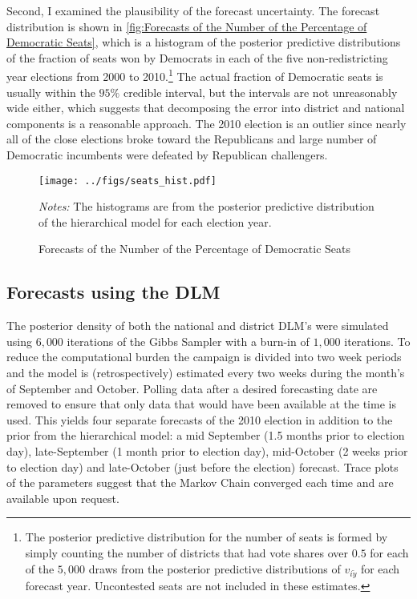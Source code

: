 \documentclass[12pt,final,fleqn]{article}
\theoremstyle{plain}
\begin{document}
Second, I examined the plausibility of the forecast uncertainty. The forecast distribution is shown in \autoref{fig:Forecasts of the Number of the Percentage of Democratic Seats}, which is a histogram of the posterior predictive distributions of the fraction of seats won by Democrats in each of the five non-redistricting year elections from 2000 to 2010.\footnote{ The posterior predictive distribution for the number of seats is formed by simply counting the number of districts that had vote shares over $0.5$ for each of the $5,000$ draws from the posterior predictive distributions of $v_{i\tilde{y}}$ for each forecast year. Uncontested seats are not included in these estimates.} The actual fraction of Democratic seats is usually within the $95\%$ credible interval, but the intervals are not unreasonably wide either, which suggests that decomposing the error into district and national components is a reasonable approach. The 2010 election is an outlier since nearly all of the close elections broke toward the Republicans and large number of Democratic incumbents were defeated by Republican challengers. 

\begin{figure}[!htb]
\centering
\texttt{[image: ../figs/seats\_hist.pdf]}
\vspace{.5cm}
\caption{Forecasts of the Number of the Percentage of Democratic Seats}
\label{fig:Forecasts of the Number of the Percentage of Democratic Seats}
\begin{minipage}{\linewidth}
\footnotesize
\emph{Notes:} The histograms are from the posterior predictive distribution of the hierarchical model for each election year.
\end{minipage}
\end{figure}

\subsection{Forecasts using the DLM} \label{sec: Results from the DLM}
The posterior density of both the national and district DLM's were simulated using $6,000$ iterations of the Gibbs Sampler with a burn-in of $1,000$ iterations. To reduce the computational burden the campaign is divided into two week periods and the model is (retrospectively) estimated every two weeks during the month's of September and October. Polling data after a desired forecasting date are removed to ensure that only data that would have been available at the time is used. This yields four separate forecasts of the 2010 election in addition to the prior from the hierarchical model: a mid September (1.5 months prior to election day), late-September (1 month prior to election day), mid-October (2 weeks prior to election day) and late-October (just before the election) forecast. Trace plots of the parameters suggest that the Markov Chain converged each time and are available upon request.
\end{document}
